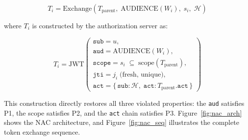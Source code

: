 \documentclass[journal]{IEEEtran}
\begin{document}
\begin{equation}
T_i = \mathrm{Exchange}\!\left(
  T_{\mathrm{parent}},\;
  \mathrm{AUDIENCE}(W_i),\;
  s_i,\;
  \mathcal{H}
\right)
\label{eq:exchange}
\end{equation}

where $T_i$ is constructed by the authorization server as:

\begin{equation}
T_i = \mathrm{JWT}\!\left(\begin{array}{l}
  \texttt{sub} = u, \\[2pt]
  \texttt{aud} = \mathrm{AUDIENCE}(W_i), \\[2pt]
  \texttt{scope} = s_i \;\subseteq\; \mathrm{scope}(T_{\mathrm{parent}}), \\[2pt]
  \texttt{jti} = j_i \;\text{(fresh, unique)}, \\[2pt]
  \texttt{act} = \{\,\texttt{sub}\text{:}\,\mathcal{H},\;
                    \texttt{act}\text{:}\,T_{\mathrm{parent}}.\texttt{act}\,\}
\end{array}\right)
\label{eq:child}
\end{equation}

This construction directly restores all three violated properties: the
\texttt{aud} satisfies P1, the scope satisfies P2, and the \texttt{act} chain
satisfies P3. Figure~\ref{fig:nac_arch} shows the NAC architecture, and
Figure~\ref{fig:nac_seq} illustrates the complete token exchange sequence.
\end{document}

